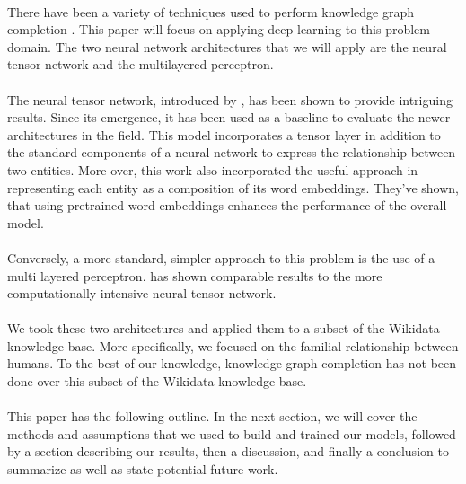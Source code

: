 \documentclass[11.5pt]{article}
\begin{document}
\paragraph{} There have been a variety of techniques used to perform knowledge graph completion \cite{nickel2016review}. This paper will focus on applying deep learning to this problem domain. The two neural network architectures that we will apply are the neural tensor network and the multilayered perceptron. 

\paragraph{} The neural tensor network, introduced by \cite{socher2013reasoning}, has been shown to provide intriguing results. Since its emergence, it has been used as a baseline to evaluate the newer architectures in the field. This model incorporates a tensor layer in addition to the standard components of a neural network to express the relationship between two entities. More over, this work also incorporated the useful approach in representing each entity as a composition of its word embeddings. They've shown, that using pretrained word embeddings enhances the performance of the overall model.

\paragraph{}Conversely, a more standard, simpler approach to this problem is the use of a multi layered perceptron. \cite{dong2014knowledge} has shown comparable results to the more computationally intensive neural tensor network.

\paragraph{}We took these two architectures and applied them to a subset of the Wikidata knowledge base. More specifically, we focused on the familial relationship between humans. To the best of our knowledge, knowledge graph completion has not been done over this subset of the Wikidata knowledge base.

\paragraph{}This paper has the following outline. In the next section, we will cover the methods and assumptions that we used to build and trained our models, followed by a section describing our results, then a discussion, and finally a conclusion to summarize as well as state potential future work.
\end{document}
